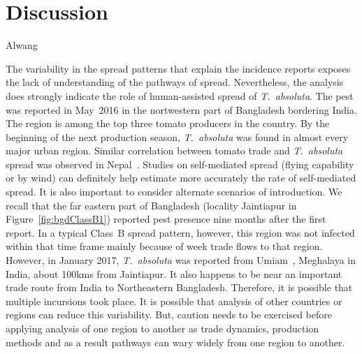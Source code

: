 \documentclass[11pt]{article}
\newcommand{\tuta}{\emph{T.~absoluta}}
\theoremstyle{definition}
\begin{document}
\section{Discussion}
Alwang

The variability in the spread patterns that explain the incidence reports
exposes the lack of understanding of the pathways of spread.
Nevertheless, the analysis does strongly indicate the role of
human-assisted spread of \tuta{}. The pest was reported in May~2016 in the
nortwestern part of Bangladesh bordering India. The region is among the top
three tomato producers in the country. By the beginning of the next
production season, \tuta{} was found in almost every major urban region.
Similar correlation between tomato trade and \tuta{} spread was observed in
Nepal~\cite{venkatramanan2019modeling}. Studies on
self-mediated spread (flying capability or by wind) can definitely help
estimate more accurately the rate of self-mediated spread. It is also
important to consider alternate scenarios of introduction. We recall that
the far eastern part of Bangladesh (locality Jaintiapur in
Figure~\ref{fig:bgdClassB1}) reported pest presence nine months after the
first report. In a typical Class~B spread pattern, however, this region was
not infected within that time frame mainly because of week trade flows to
that region. However, in January 2017, \tuta{} was reported from
Umiam~\cite{sankarganesh2017}, Meghalaya in India, about 100kms from
Jaintiapur. It also happens to be near an important trade route from India
to Northeastern Bangladesh. Therefore, it is possible that multiple
incursions took place. It is possible that analysis of other countries or
regions can reduce this variability. But, caution needs to be exercised
before applying analysis of one region to another as trade dynamics,
production methods and as a result pathways can wary widely from one region
to another.
\end{document}
